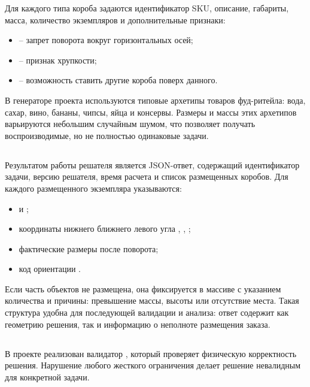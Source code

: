 Для каждого типа короба задаются идентификатор SKU, описание, габариты, масса, количество экземпляров и дополнительные признаки:
\begin{itemize}
  \item {} -- запрет поворота вокруг горизонтальных осей;
  \item {} -- признак хрупкости;
  \item {} -- возможность ставить другие короба поверх данного.
\end{itemize}

В генераторе проекта используются типовые архетипы товаров фуд-ритейла: вода, сахар, вино, бананы, чипсы, яйца и консервы. Размеры и массы этих архетипов варьируются небольшим случайным шумом, что позволяет получать воспроизводимые, но не полностью одинаковые задачи.

\subsection{}

Результатом работы решателя является JSON-ответ, содержащий идентификатор задачи, версию решателя, время расчета и список размещенных коробов. Для каждого размещенного экземпляра указываются:
\begin{itemize}
  \item {} и ;
  \item координаты нижнего ближнего левого угла , , ;
  \item фактические размеры после поворота;
  \item код ориентации .
\end{itemize}

Если часть объектов не размещена, она фиксируется в массиве  с указанием количества и причины: превышение массы, высоты или отсутствие места. Такая структура удобна для последующей валидации и анализа: ответ содержит как геометрию решения, так и информацию о неполноте размещения заказа.

\subsection{}

В проекте реализован валидатор , который проверяет физическую корректность решения. Нарушение любого жесткого ограничения делает решение невалидным для конкретной задачи.

